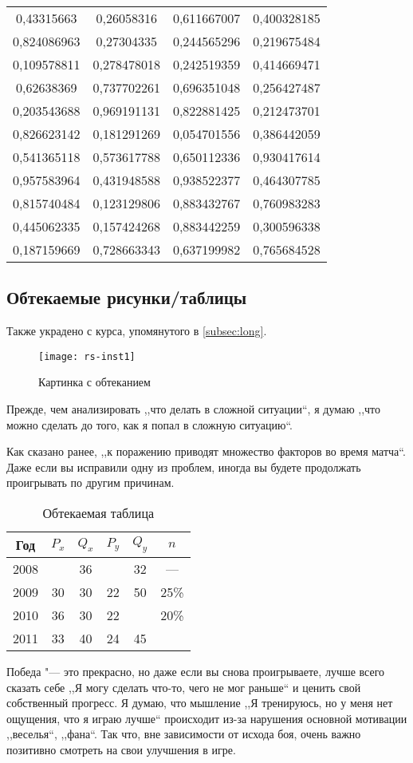\begin{longtable}{|c|c|c|c|}
0,43315663 & 0,26058316 & 0,611667007 & 0,400328185 \\
0,824086963 & 0,27304335 & 0,244565296 & 0,219675484 \\
0,109578811 & 0,278478018 & 0,242519359 & 0,414669471 \\
0,62638369 & 0,737702261 & 0,696351048 & 0,256427487 \\
0,203543688 & 0,969191131 & 0,822881425 & 0,212473701 \\
0,826623142 & 0,181291269 & 0,054701556 & 0,386442059 \\
0,541365118 & 0,573617788 & 0,650112336 & 0,930417614 \\
0,957583964 & 0,431948588 & 0,938522377 & 0,464307785 \\
0,815740484 & 0,123129806 & 0,883432767 & 0,760983283 \\
0,445062335 & 0,157424268 & 0,883442259 & 0,300596338 \\
0,187159669 & 0,728663343 & 0,637199982 & 0,765684528 \\
\end{longtable}

\subsection{Обтекаемые рисунки/таблицы}
Также украдено с курса, упомянутого в \vref{subsec:long}. ~\\

\begin{wrapfigure}{l}{0.5\linewidth}
	\texttt{[image: rs-inst1]}
	\caption{Картинка с обтеканием}
\end{wrapfigure}
Прежде, чем анализировать ,,что делать в сложной ситуации``, я думаю ,,что можно сделать до того, как я попал в сложную ситуацию``. 

Как сказано ранее, ,,к поражению приводят множество факторов во время матча``. Даже если вы исправили одну из проблем, иногда вы будете продолжать проигрывать по другим причинам.

\begin{wraptable}{r}{0.5\linewidth}
	\centering
	\begin{tabular}{|c|c|c|c|c|c|}
		\hline
		Год & $P_x$ &$Q_x$ & $P_y$ & $Q_y$ & $n$\\ \hline
		2008 &  & 36 &  & 32 & — \\ \hline
		2009 & 30 & 30 & 22 & 50 & 25\% \\ \hline
		2010 & 36 & 30 & 22 &  & 20\% \\ \hline
		2011 & 33 & 40 & 24 & 45 & \\ \hline
	\end{tabular}
	\caption{Обтекаемая таблица}
\end{wraptable}
Победа "--- это прекрасно, но даже если вы снова проигрываете, лучше всего сказать себе ,,Я могу сделать что-то, чего не мог раньше`` и ценить свой собственный прогресс.
Я думаю, что мышление ,,Я тренируюсь, но у меня нет ощущения, что я играю лучше`` происходит из-за нарушения основной мотивации ,,веселья``, ,,фана``. Так что, вне зависимости от исхода боя, очень важно позитивно смотреть на свои улучшения в игре.

